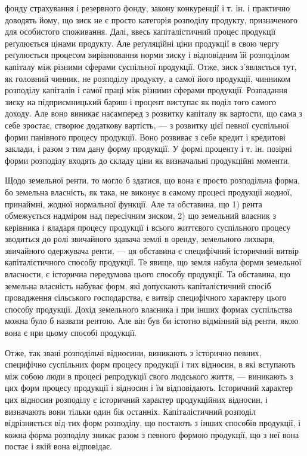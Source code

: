 фонду страхування і резервного фонду, закону конкуренції і т. ін. і практично
доводять йому, що зиск не є просто категорія розподілу продукту, призначеного
для особистого споживання. Далі, ввесь капіталістичний процес продукції реґулюється
цінами продукту. Але реґуляційні ціни продукції в свою чергу реґулюється
процесом вирівнювання норми зиску і відповідним їй розподілом капіталу
між різними сферами суспільної продукції. Отже, зиск з’являється тут, як головний
чинник, не розподілу продукту, а самої його продукції, чинником розподілу
капіталів і самої праці між різними сферами продукції. Розпадання зиску на
підприємницький бариш і процент виступає як поділ того самого доходу. Але воно
виникає насамперед з розвитку капіталу як вартости, що сама з себе зростає, створює
додаткову вартість, — з розвитку цієї певної суспільної форми панівного
процесу продукції. Воно розвиває з себе кредит і кредитові заклади, і разом з
тим дану форму продукції. У формі проценту і т. ін. позірні форми розподілу
входять до складу ціни як визначальні продукційні моменти.

Щодо земельної ренти, то могло б здатися, що вона є просто розподільча
форма, бо земельна власність, як така, не виконує в самому процесі продукції
жодної, принаймні, жодної нормальної функції. Але та обставина, що 1) рента
обмежується надміром над пересічним зиском, 2) що земельний власник з керівника
і владаря процесу продукції і всього життєвого суспільного процесу зводиться
до ролі звичайного здавача землі в оренду, земельного лихваря, звичайного
одержувача ренти, — ця обставина є специфічний історичний витвір капіталістичного
способу продукції. Те явище, що земля набула форми земельної
власности, є історична передумова цього способу продукції. Та обставина, що
земельна власність набуває форм, які допускають капіталістичний спосіб провадження
сільського господарства, є витвір специфічного характеру цього способу
продукції. Дохід земельного власника і при інших формах суспільства
можна було б назвати рентою. Але він був би істотно відмінний від ренти,
якою вона є при цьому способі продукції.

Отже, так звані розподільчі відносини, виникають з історично певних,
специфічно суспільних форм процесу продукції і тих відносин, в які вступають
між собою люди в процесі репродукції свого людського життя, — виникають з цих
форм процесу продукції і відносин і їм відповідають. Історичний характер цих
відносин розподілу є історичний характер продукційних відносин, і визначають вони
тільки один бік останніх. Капіталістичний розподіл відрізняється від тих форм
розподілу, що постають з інших способів продукції, і кожна форма розподілу зникає
разом з певного формою продукції, що з неї вона постає і якій вона відповідає.

